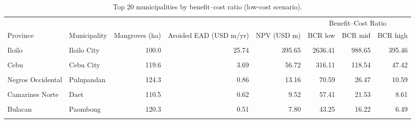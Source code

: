 \begin{table}[!h]
\centering
\caption{\label{tab:tab:top20_bcr}Top 20 municipalities by benefit--cost ratio (low-cost scenario).}
\centering
\fontsize{8}{10}\selectfont
\begin{tabular}[t]{llrrrrrr}
\toprule
\multicolumn{5}{c}{ } & \multicolumn{3}{c}{Benefit--Cost Ratio} \\
\cmidrule(l{3pt}r{3pt}){6-8}
Province & Municipality & Mangroves (ha) & Avoided EAD (USD m/yr) & NPV (USD m) & BCR low & BCR mid & BCR high\\
\midrule
\cellcolor{gray!10}{Cebu} & \cellcolor{gray!10}{Talisay City} & \cellcolor{gray!10}{4.9} & \cellcolor{gray!10}{1.60} & \cellcolor{gray!10}{24.61} & \cellcolor{gray!10}{3338.65} & \cellcolor{gray!10}{1252.00} & \cellcolor{gray!10}{500.80}\\
Iloilo & Iloilo City & 100.0 & 25.74 & 395.65 & 2636.41 & 988.65 & 395.46\\
\cellcolor{gray!10}{Negros Occidental} & \cellcolor{gray!10}{Enrique B. Magalona} & \cellcolor{gray!10}{1.0} & \cellcolor{gray!10}{0.08} & \cellcolor{gray!10}{1.23} & \cellcolor{gray!10}{814.76} & \cellcolor{gray!10}{305.53} & \cellcolor{gray!10}{122.21}\\
Cebu & Cebu City & 119.6 & 3.69 & 56.72 & 316.11 & 118.54 & 47.42\\
\cellcolor{gray!10}{Cebu} & \cellcolor{gray!10}{Cordoba} & \cellcolor{gray!10}{60.4} & \cellcolor{gray!10}{0.70} & \cellcolor{gray!10}{10.83} & \cellcolor{gray!10}{119.60} & \cellcolor{gray!10}{44.85} & \cellcolor{gray!10}{17.94}\\
\addlinespace
Negros Occidental & Pulupandan & 124.3 & 0.86 & 13.16 & 70.59 & 26.47 & 10.59\\
\cellcolor{gray!10}{Cebu} & \cellcolor{gray!10}{Pinamungahan} & \cellcolor{gray!10}{124.5} & \cellcolor{gray!10}{0.74} & \cellcolor{gray!10}{11.42} & \cellcolor{gray!10}{61.14} & \cellcolor{gray!10}{22.93} & \cellcolor{gray!10}{9.17}\\
Camarines Norte & Daet & 110.5 & 0.62 & 9.52 & 57.41 & 21.53 & 8.61\\
\cellcolor{gray!10}{Negros Occidental} & \cellcolor{gray!10}{Calatrava} & \cellcolor{gray!10}{163.1} & \cellcolor{gray!10}{0.76} & \cellcolor{gray!10}{11.68} & \cellcolor{gray!10}{47.74} & \cellcolor{gray!10}{17.90} & \cellcolor{gray!10}{7.16}\\
Bulacan & Paombong & 120.3 & 0.51 & 7.80 & 43.25 & 16.22 & 6.49\\
\addlinespace
\cellcolor{gray!10}{Capiz} & \cellcolor{gray!10}{Roxas City} & \cellcolor{gray!10}{370.4} & \cellcolor{gray!10}{1.52} & \cellcolor{gray!10}{23.43} & \cellcolor{gray!10}{42.17} & \cellcolor{gray!10}{15.81} & \cellcolor{gray!10}{6.33}\\

\end{tabular}
\end{table}
